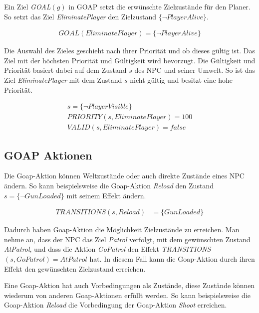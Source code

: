 Ein Ziel \textit{GOAL}$(g)$ in GOAP setzt die erw\"{u}nschte Zielzust\"{a}nde f\"{u}r den Planer. So setzt das Ziel \textit{EliminatePlayer} den Zielzustand $\{\lnot \textit{PlayerAlive}\}$.

\begin{align}
	\textit{GOAL}(\textit{EliminatePlayer}) = \{\lnot \textit{PlayerAlive}\}
\end{align}


Die Auswahl des Zieles geschieht nach ihrer Priorit\"{a}t und ob dieses g\"{u}ltig ist. Das Ziel mit der h\"{o}chsten Priorit\"{a}t und G\"{u}ltigkeit wird bevorzugt. Die G\"{u}ltigkeit und Priorit\"{a}t basiert dabei auf dem Zustand $s$ des NPC und seiner Umwelt. So ist das Ziel \textit{EliminatePlayer} mit dem Zustand $s$ nicht g\"{u}ltig und besitzt eine hohe Priorit\"{a}t.

\begin{align}
	s = \{\lnot \textit{PlayerVisible}\} \\
	\textit{PRIORITY}(s,\textit{EliminatePlayer}) = 100 \\
	\textit{VALID}(s,\textit{EliminatePlayer}) = \textit{false}
\end{align}


\subsection{GOAP Aktionen}
\label{chap:goap actions}

Die Goap-Aktion k\"{o}nnen Weltzust\"{a}nde oder auch direkte Zust\"{a}nde eines NPC \"{a}ndern. So kann beispielsweise die Goap-Aktion \textit{Reload} den Zustand $s = \{\lnot \textit{GunLoaded}\}$ mit seinem Effekt \"{a}ndern.

\begin{align}
	\textit{TRANSITIONS}(s,\textit{Reload}) &= \{\textit{GunLoaded}\}
\end{align}


Dadurch haben Goap-Aktion die M\"{o}glichkeit Zielzust\"{a}nde zu erreichen. Man nehme an, dass der NPC das Ziel \textit{Patrol} verfolgt, mit dem gew\"{u}nschten Zustand \textit{AtPatrol}, und dass die Aktion \textit{GoPatrol} den Effekt \textit{TRANSITIONS}$(s, \textit{GoPatrol}) = {\textit{AtPatrol}}$ hat. In diesem Fall kann die Goap-Aktion durch ihren Effekt den gew\"{u}nschten Zielzustand erreichen.

Eine Goap-Aktion hat auch Vorbedingungen als Zust\"{a}nde, diese Zust\"{a}nde k\"{o}nnen wiederum von anderen Goap-Aktionen erf\"{u}llt werden. So kann beispielsweise die Goap-Aktion \textit{Reload} die Vorbedingung der Goap-Aktion \textit{Shoot} erreichen.

